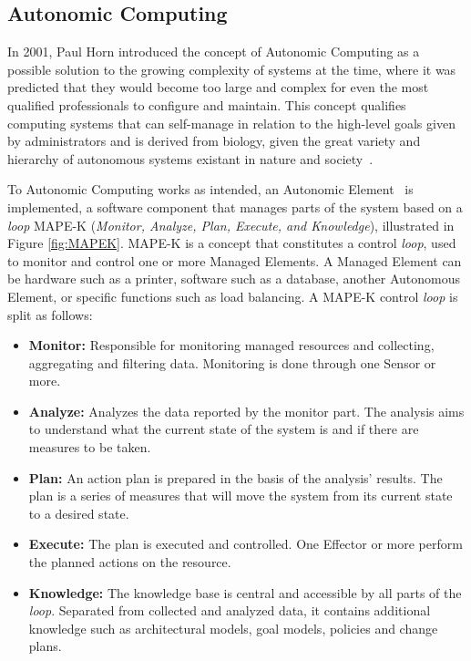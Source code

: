 \documentclass[runningheads]{llncs}
\begin{document}
\subsection{Autonomic Computing}

In 2001, Paul Horn introduced the concept of Autonomic Computing as a possible solution to the growing complexity of systems at the time, where it was predicted that they would become too large and complex for even the most qualified professionals to configure and maintain. This concept qualifies computing systems that can self-manage in relation to the high-level goals given by administrators and is derived from biology, given the great variety and hierarchy of autonomous systems existant in nature and society~\citep{Kephart_2003}.

To Autonomic Computing works as intended, an Autonomic Element~\citep{Abbas_2010} is implemented, a software component that manages parts of the system based on a \textit{loop} MAPE-K (\textit{Monitor, Analyze, Plan, Execute, and Knowledge}), illustrated in Figure \ref{fig:MAPEK}. MAPE-K is a concept that constitutes a control \textit{loop}, used to monitor and control one or more Managed Elements. A Managed Element can be hardware such as a printer, software such as a database, another Autonomous Element, or specific functions such as load balancing. A MAPE-K control \textit{loop} is split as follows:

\begin{itemize}
\item \textbf{Monitor:} Responsible for monitoring managed resources and collecting, aggregating and filtering data. Monitoring is done through one Sensor or more.
\item \textbf{Analyze:} Analyzes the data reported by the monitor part. The analysis aims to understand what the current state of the system is and if there are measures to be taken.
\item \textbf{Plan:} An action plan is prepared in the basis of the analysis' results. The plan is a series of measures that will move the system from its current state to a desired state.
\item \textbf{Execute:} The plan is executed and controlled. One Effector or more perform the planned actions on the resource.
\item \textbf{Knowledge:} The knowledge base is central and accessible by all parts of the \textit{loop}. Separated from collected and analyzed data, it contains additional knowledge such as architectural models, goal models, policies and change plans.
\end{itemize}
\end{document}
